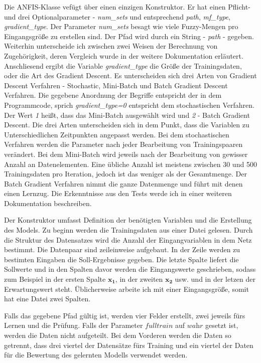 Die ANFIS-Klasse vefügt über einen einzigen Konstruktor. Er hat einen
Pflicht- und drei Optionalparameter - \emph{num\_sets} und entsprechend
\emph{path}, \emph{mf\_type}, \emph{gradient\_type}. Der Parameter
\emph{num\_sets} besagt wie viele Fuzzy-Mengen pro Eingangsgröße zu
erstellen sind. Der Pfad wird durch ein String - \emph{path} - gegeben.
Weiterhin unterscheide ich zwischen zwei Weisen der Berechnung von
Zugehörigkeit, deren Vergleich wurde in der weitere Dokumentation
erläutert. Anschliesend ergibt die Variable \emph{gradient\_type} die
Größe der Trainingsdaten, oder die Art des Gradient Descent. Es
unterscheiden sich drei Arten von Gradient Descent Verfahren -
Stochastic, Mini-Batch und Batch Gradient Descent Verfahren. Die
gegebene Anordnung der Begriffe entspricht der in dem Programmcode,
sprich \emph{gradient\_type=0} entspricht dem stochastischen Verfahren.
Der Wert \emph{1} heißt, dass das Mini-Batch ausgewählt wird und
\emph{2} - Batch Gradient Descent. Die drei Arten unterscheiden sich in
dem Punkt, dass die Variablen zu Unterschiedlichen Zeitpunkten angepasst
werden. Bei dem stochastischen Verfahren werden die Parameter nach jeder
Bearbeitung von Trainingspaaren verändert. Bei dem Mini-Batch wird
jeweils nach der Bearbeitung von gewisser Anzahl an Datenelementen. Eine
übliche Anzahl ist meistens zwischen 30 und 500 Trainingsdaten pro
Iteration, jedoch ist das weniger als der Gesamtmenge. Der Batch
Gradient Verfahren nimmt die ganze Datenmenge und führt mit denen einen
Lernzug. Die Erkenntnisse aus den Tests werde ich in einer weiteren
Dokumentation beschreiben.

Der Konstruktor umfasst Definition der benötigten Variablen und die
Erstellung des Models. Zu beginn werden die Trainingsdaten aus einer
Datei gelesen. Durch die Struktur des Datensatzes wird die Anzahl der
Eingangvariablen in dem Netz bestimmt. Die Datenpaar sind zeileinweise
aufgebaut. In der Zeile werden zu bestimten Eingaben die Soll-Ergebnisse
gegeben. Die letzte Spalte liefert die Sollwerte und in den Spalten
davor werden die Eingangswerte geschrieben, sodass zum Beispiel in der
ersten Spalte \(\mathbf{x_1}\), in der zweiten \(\mathbf{x_2}\) usw. und
in der letzen der Erwartungswert steht. Üblicherweise arbeite ich mit
einer Eingangsgröße, somit hat eine Datei zwei Spalten.

Falls das gegebene Pfad gültig ist, werden vier Felder erstellt, zwei
jeweils fürs Lernen und die Prüfung. Falls der Parameter
\(\textit{fulltrain}\) auf \(\textit{wahr}\) gesetzt ist, werden die
Daten nicht aufgeteilt. Bei dem Vorderen werden die Daten so getrennt,
dass drei viertel der Datensätze fürs Training und ein viertel der Daten
für die Bewertung des gelernten Modells verwendet werden.

